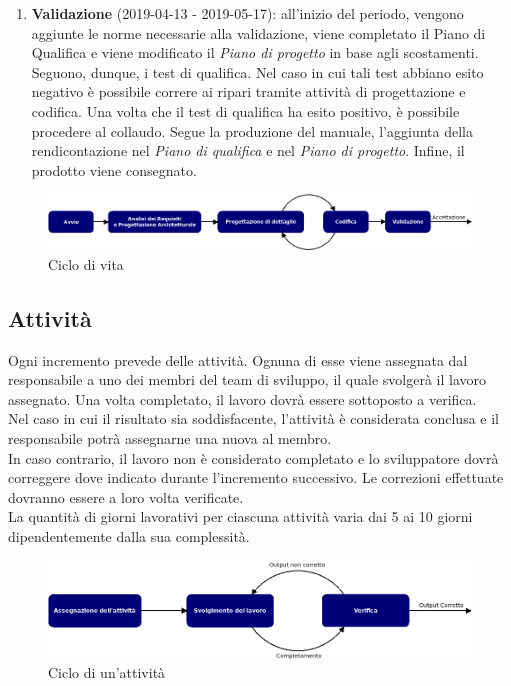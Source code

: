 \begin{enumerate}
	\item \textbf{Validazione} (2019-04-13 - 2019-05-17): all'inizio del periodo, vengono aggiunte le norme necessarie alla validazione, viene completato il Piano di Qualifica e viene modificato il \textit{Piano di progetto} in base agli scostamenti. Seguono, dunque, i test di qualifica. Nel caso in cui tali test abbiano esito negativo è possibile correre ai ripari tramite attività di progettazione e codifica. Una volta che il test di qualifica ha esito positivo, è possibile procedere al collaudo. Segue la produzione del manuale, l'aggiunta della rendicontazione nel \textit{Piano di qualifica} e nel \textit{Piano di progetto}. Infine, il prodotto viene consegnato.
\end{enumerate}

\begin{figure}[h]
	\centering
	\includegraphics[scale=0.4]{images/Model/model.png}
	\caption{Ciclo di vita}
\end{figure}

\subsection{Attività}
Ogni incremento prevede delle attività. Ognuna di esse viene assegnata dal responsabile a uno dei membri del team di sviluppo, il quale svolgerà il lavoro assegnato. Una volta completato, il lavoro dovrà essere sottoposto a verifica.\\
Nel caso in cui il risultato sia soddisfacente, l'attività è considerata conclusa e il responsabile potrà assegnarne una nuova al membro.\\ 
In caso contrario, il lavoro non è considerato completato e lo sviluppatore dovrà correggere dove indicato durante l'incremento successivo. Le correzioni effettuate dovranno essere a loro volta verificate.\\
La quantità di giorni lavorativi per ciascuna attività varia dai 5 ai 10 giorni dipendentemente dalla sua complessità.

\begin{figure}[h]
	\centering
	\includegraphics[scale=0.45]{images/Model/activity.png}
	\caption{Ciclo di un'attività}
\end{figure}

